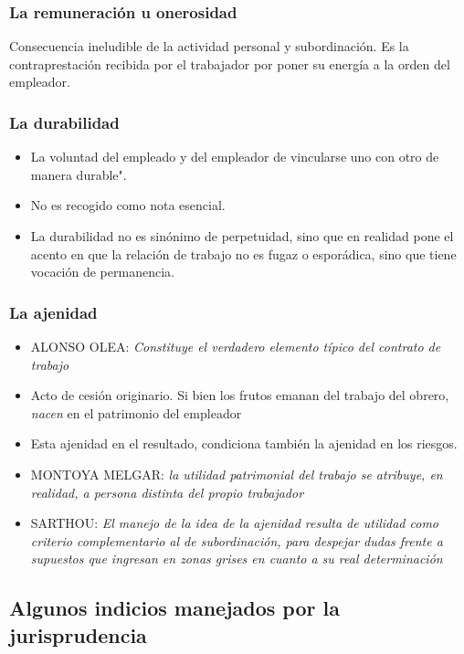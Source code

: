\documentclass[spanish,12pt,a4paper,titlepage]{report}
\begin{document}
\subsubsection{La remuneración u onerosidad}
Consecuencia ineludible de la actividad personal y subordinación. Es la contraprestación recibida por el trabajador por poner su energía a la orden del empleador.

\subsubsection{La durabilidad}
\begin{itemize}
\item La voluntad del empleado y del empleador de vincularse uno con otro de manera durable". 
\item No es recogido como nota esencial. 
\item La durabilidad no es sinónimo de perpetuidad, sino que en realidad pone el acento en que la relación de trabajo no es fugaz o esporádica, sino que tiene vocación de permanencia.	
\end{itemize}

\subsubsection{La ajenidad}
\begin{itemize}
	\item ALONSO OLEA: \textit{Constituye el verdadero elemento típico del contrato de trabajo}
	\item Acto de cesión originario. Si bien los frutos emanan del trabajo del obrero, \textit{nacen} en el patrimonio del empleador
	\item Esta ajenidad en el resultado, condiciona también la ajenidad en los riesgos.
	\item MONTOYA MELGAR: \textit{la utilidad patrimonial del trabajo se atribuye, en realidad, a persona distinta del propio trabajador}
	\item SARTHOU: \textit{El manejo de la idea de la ajenidad resulta de utilidad como criterio complementario al de subordinación, para despejar dudas frente a supuestos que ingresan en zonas grises en cuanto a su real determinación}
\end{itemize}

\subsection{Algunos indicios manejados por la jurisprudencia}
\end{document}

